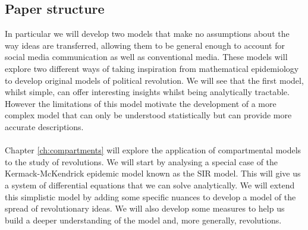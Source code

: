 \subsection{Paper structure}
In particular we will develop two models that make no assumptions about the way ideas are transferred, allowing them to be general enough to account for social media communication as well as conventional media. These models will explore two different ways of taking inspiration from mathematical epidemiology to develop original models of political revolution. We will see that the first model, whilst simple, can offer interesting insights whilst being analytically tractable. However the limitations of this model motivate the development of a more complex model that can only be understood statistically but can provide more accurate descriptions.\\
\\
Chapter \ref{ch:compartments} will explore the application of compartmental models to the study of revolutions. We will start by analysing a special case of the Kermack-McKendrick epidemic model known as the SIR model. This will give us a system  of differential equations that we can solve analytically. We will extend this simplistic model by adding some specific nuances to develop a model of the spread of revolutionary ideas. We will also develop some measures to help us build a deeper understanding of the model and, more generally, revolutions.\\
\\
